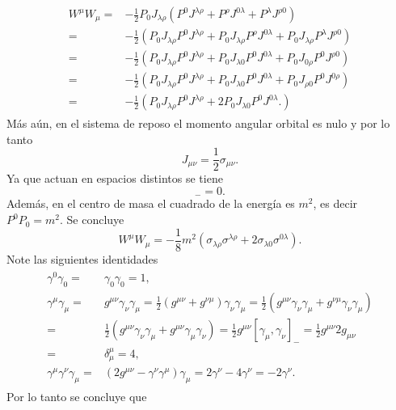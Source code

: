 \documentclass{article}
\begin{document}
\begin{enumerate}
\begin{align}
\begin{split}
W^\mu W_\mu=&-\frac{1}{2}P_0 J_{\lambda\rho}(P^0 J^{\lambda\rho}+P^{\rho} J^{0\lambda}+P^{\lambda} J^{\rho 0})\\
=&-\frac{1}{2}(P_0J_{\lambda\rho}P^0J^{\lambda\rho}+P_0J_{\lambda\rho}P^\rho J^{0\lambda}+P_0J_{\lambda\rho}P^\lambda J^{\rho0})\\
=&-\frac{1}{2}(P_0J_{\lambda\rho}P^0J^{\lambda\rho}+P_0J_{\lambda0}P^0 J^{0\lambda}+P_0J_{0\rho}P^0 J^{\rho0})\\
=&-\frac{1}{2}(P_0J_{\lambda\rho}P^0J^{\lambda\rho}+P_0J_{\lambda0}P^0 J^{0\lambda}+P_0J_{\rho 0}P^0 J^{0\rho})\\
=&-\frac{1}{2}(P_0J_{\lambda\rho}P^0J^{\lambda\rho}+2P_0J_{\lambda0}P^0 J^{0\lambda}.)
\end{split}
\end{align} 
Más aún, en el sistema de reposo el momento angular orbital es nulo y por lo tanto
\begin{equation}
J_{\mu\nu}=\frac{1}{2}\sigma_{\mu\nu}.
\end{equation}
Ya que actuan en espacios distintos se tiene
\begin{equation}
[P^\mu,\sigma^{\nu\lambda}]_-=0.
\end{equation}
Además, en el centro de masa el cuadrado de la energía es $m^2$, es decir $P^0P_0=m^2$. Se concluye
\begin{equation}
W^\mu W_\mu=-\frac{1}{8}m^2(\sigma_{\lambda\rho}\sigma^{\lambda\rho}+2\sigma_{\lambda0}\sigma^{0\lambda}).
\end{equation}
Note las siguientes identidades
\begin{align}
\begin{split}
\gamma^0\gamma_0=&\gamma_0\gamma_0=1,\\
\gamma^\mu\gamma_\mu=&g^{\mu\nu}\gamma_\nu\gamma_\mu=\frac{1}{2}(g^{\mu\nu}+g^{\nu\mu})\gamma_\nu\gamma_\mu=\frac{1}{2}(g^{\mu\nu}\gamma_\nu\gamma_\mu+g^{\nu\mu}\gamma_\nu\gamma_\mu)\\
=&\frac{1}{2}(g^{\mu\nu}\gamma_\nu\gamma_\mu+g^{\mu\nu}\gamma_\mu\gamma_\nu)=\frac{1}{2}g^{\mu\nu}[\gamma_\mu,\gamma_\nu]_-=\frac{1}{2}g^{\mu\nu}2g_{\mu\nu}\\
=&\delta^\mu_\mu=4,\\
\gamma^\mu\gamma^\nu\gamma_\mu=&(2g^{\mu\nu}-\gamma^\nu\gamma^\mu)\gamma_\mu=2\gamma^\nu-4\gamma^\nu=-2\gamma^\nu.
\end{split}
\end{align}
Por lo tanto se concluye que 

\end{enumerate}
\end{document}
